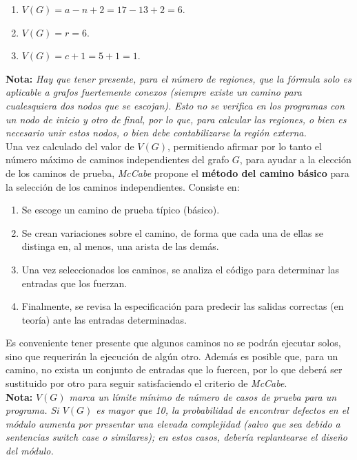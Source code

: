 \begin{enumerate}
    \item $V (G) = a-n+2 = 17-13+2 = 6$.
    \item $V (G) = r = 6$.
    \item $V (G) = c+1 = 5+1 = 1$.
\end{enumerate}

\textbf{Nota:} \textit{Hay que tener presente, para el número de regiones, que la fórmula solo es aplicable a grafos fuertemente conexos (siempre existe un camino para cualesquiera dos nodos que se escojan). Esto no se verifica en los programas con un nodo de inicio y otro de final, por lo que, para calcular las regiones, o bien es necesario unir estos nodos, o bien debe contabilizarse la región externa.}\\

Una vez calculado del valor de $V (G)$, permitiendo afirmar por lo tanto el número máximo de caminos independientes del grafo $G$, para ayudar a la elección de los caminos de prueba, \textit{McCabe} propone el \textbf{método del camino básico} para la selección de los caminos independientes. Consiste en:

\begin{enumerate}
    \item Se escoge un camino de prueba típico (básico).
    \item Se crean variaciones sobre el camino, de forma que cada una de ellas se distinga en, al menos, una arista de las demás.
    \item Una vez seleccionados los caminos, se analiza el código para determinar las entradas que los fuerzan.
    \item Finalmente, se revisa la especificación para predecir las salidas correctas (en teoría) ante las entradas determinadas.
\end{enumerate}

Es conveniente tener presente que algunos caminos no se podrán ejecutar solos, sino que requerirán la ejecución de algún otro. Además es posible que, para un camino, no exista un conjunto de entradas que lo fuercen, por lo que deberá ser sustituido por otro para seguir satisfaciendo el criterio de \textit{McCabe}.\\

\textbf{Nota:} \textit{$V (G)$ marca un límite mínimo de número de casos de prueba para un programa. Si $V (G)$ es mayor que 10, la probabilidad de encontrar defectos en el módulo aumenta por presentar una elevada complejidad (salvo que sea debido a sentencias \textit{switch case} o similares); en estos casos, debería replantearse el diseño del módulo.}


